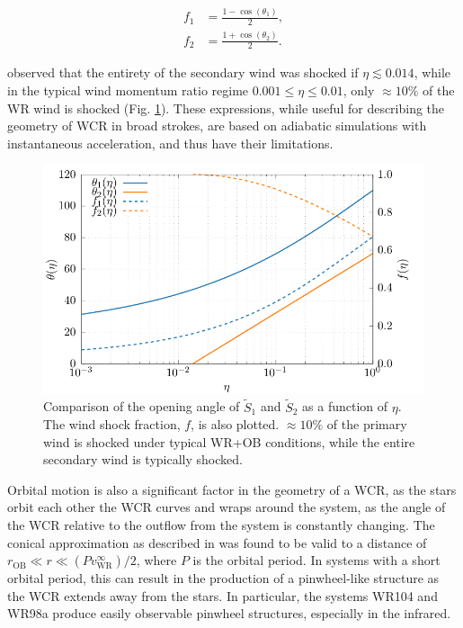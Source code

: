 \begin{subequations}
  \label{eq:windshockfraction}
  \begin{align}
    f_1 & = \frac{1 - \cos\left(\theta_1\right)}{2} , \\
    f_2 & = \frac{1 + \cos\left(\theta_2\right)}{2} .
  \end{align}
\end{subequations}

\noindent
\textcite{pittardCollidingStellarWinds2018} observed that the entirety of the secondary wind was shocked if $\eta \lesssim 0.014$, while in the typical wind momentum ratio regime $0.001 \leq \eta \leq 0.01$, only $\approx 10\%$ of the WR wind is shocked (Fig. \ref{fig:wind-shock-factor}).
These expressions, while useful for describing the geometry of WCR in broad strokes, are based on adiabatic simulations with instantaneous acceleration, and thus have their limitations.

\begin{figure}
  \centering
  \includegraphics[]{assets/wind-shock-factor/shock-factor.pdf}
  \caption[Wind shock fraction, as a function of $\eta$]{Comparison of the opening angle of $\widetilde{S}_1$ and $\widetilde{S}_2$ as a function of $\eta$. The wind shock fraction, $f$, is also plotted. $\approx 10\%$ of the primary wind is shocked under typical WR+OB conditions, while the entire secondary wind is typically shocked.}
  \label{fig:wind-shock-factor}
\end{figure}

Orbital motion is also a significant factor in the geometry of a WCR, as the stars orbit each other the WCR curves and wraps around the system, as the angle of the WCR relative to the outflow from the system is constantly changing.
The conical approximation as described in \textcite{eichler_particle_1993} was found to be valid to a distance of $r_\text{OB} \ll r \ll (P v^\infty_\text{WR})/2$, where $P$ is the orbital period.
In systems with a short orbital period, this can result in the production of a pinwheel-like structure as the WCR extends away from the stars.
In particular, the systems WR104 and WR98a produce easily observable pinwheel structures, especially in the infrared.

